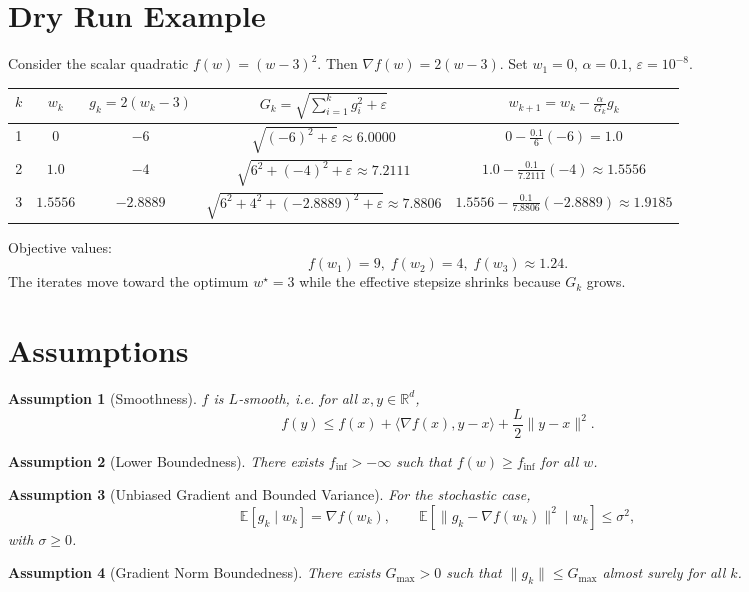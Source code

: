 \documentclass{article}
\newtheorem{assumption}{Assumption}
\newcommand{\E}{\mathbb{E}}
\newcommand{\R}{\mathbb{R}}
\begin{document}
\section*{Dry Run Example}
Consider the scalar quadratic $f(w)=(w-3)^2$.  
Then $\nabla f(w)=2(w-3)$.  Set $w_1=0$, $\alpha=0.1$, $\varepsilon=10^{-8}$.

\begin{center}
\begin{tabular}{c|c|c|c|c}
$k$ & $w_k$ & $g_k=2(w_k-3)$ & $G_k=\sqrt{\sum_{i=1}^{k} g_i^{2}+\varepsilon}$ & $w_{k+1}=w_k-\frac{\alpha}{G_k}g_k$ \\ \hline
1 & $0$ & $-6$ & $\sqrt{(-6)^2+\varepsilon}\approx6.0000$ & $0-\frac{0.1}{6}(-6)=1.0$ \\
2 & $1.0$ & $-4$ & $\sqrt{6^2+(-4)^2+\varepsilon}\approx7.2111$ & $1.0-\frac{0.1}{7.2111}(-4)\approx1.5556$ \\
3 & $1.5556$ & $-2.8889$ & $\sqrt{6^2+4^2+(-2.8889)^2+\varepsilon}\approx7.8806$ &
$1.5556-\frac{0.1}{7.8806}(-2.8889)\approx1.9185$
\end{tabular}
\end{center}

Objective values:
\[
f(w_1)=9,\; f(w_2)=4,\; f(w_3)\approx1.24.
\]
The iterates move toward the optimum $w^\star=3$ while the effective stepsize shrinks because $G_k$ grows.

\newpage
\section*{Assumptions}
\begin{assumption}[Smoothness]\label{ass:smooth}
$f$ is $L$‑smooth, i.e. for all $x,y\in\R^{d}$,
\[
f(y)\le f(x)+\langle\nabla f(x),y-x\rangle+\frac{L}{2}\|y-x\|^{2}.
\tag{3}
\]
\end{assumption}
\begin{assumption}[Lower Boundedness]\label{ass:lb}
There exists $f_{\inf}>-\infty$ such that $f(w)\ge f_{\inf}$ for all $w$.
\end{assumption}
\begin{assumption}[Unbiased Gradient and Bounded Variance]\label{ass:stoch}
For the stochastic case,
\[
\E\!\left[g_k\mid w_k\right]=\nabla f(w_k),\qquad
\E\!\left[\|g_k-\nabla f(w_k)\|^{2}\mid w_k\right]\le\sigma^{2},
\tag{4}
\]
with $\sigma\ge0$.
\end{assumption}
\begin{assumption}[Gradient Norm Boundedness]\label{ass:bound}
There exists $G_{\max}>0$ such that $\|g_k\|\le G_{\max}$ almost surely for all $k$.
\end{assumption}
\end{document}
